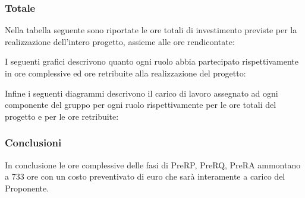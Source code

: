 



\subsubsection{Totale}
Nella tabella seguente sono riportate le ore totali di investimento previste per la realizzazione dell'intero progetto, assieme alle ore rendicontate:

I seguenti grafici descrivono quanto ogni ruolo abbia partecipato rispettivamente in ore complessive ed ore retribuite alla realizzazione del progetto:

Infine i seguenti diagrammi descrivono il carico di lavoro assegnato ad ogni componente del gruppo per ogni ruolo rispettivamente per le ore totali del progetto e per le ore retribuite:

\subsubsection{Conclusioni}
In conclusione le ore complessive delle fasi di PreRP, PreRQ, PreRA ammontano a 733 ore con un costo preventivato di euro  che sarà interamente a carico del Proponente.
